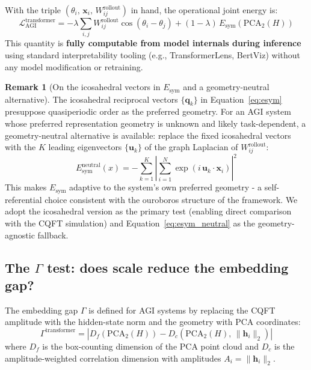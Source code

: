 \documentclass[12pt,a4paper]{article}
\theoremstyle{plain}
\theoremstyle{definition}
\newtheorem{remark}[theorem]{Remark}
\begin{document}
With the triple $(\theta_i,\, \mathbf{x}_i,\, W_{ij}^{\text{rollout}})$
in hand, the operational joint energy is:
\begin{equation}
\label{eq:lagrangian_transformer}
\mathcal{L}_{\text{AGI}}^{\text{transformer}}
  = -\lambda \sum_{i,j} W_{ij}^{\text{rollout}}
    \cos\!\left(\theta_i - \theta_j\right)
  + (1-\lambda)\, E_{\text{sym}}\!\left(\text{PCA}_2(H)\right)
\end{equation}
This quantity is \textbf{fully computable from model internals during
inference} using standard interpretability tooling (e.g.,
TransformerLens, BertViz) without any model modification or retraining.

\begin{remark}[On the icosahedral vectors in $E_{\text{sym}}$ and a
               geometry-neutral alternative]
\label{rem:esym_neutral}
The icosahedral reciprocal vectors $\{\mathbf{q}_k\}$ in
Equation~\eqref{eq:esym} presuppose quasiperiodic order as the preferred
geometry. For an AGI system whose preferred representation geometry is
unknown and likely task-dependent, a geometry-neutral alternative is
available: replace the fixed icosahedral vectors with the $K$ leading
eigenvectors $\{\mathbf{u}_k\}$ of the graph Laplacian of
$W_{ij}^{\text{rollout}}$:
\begin{equation}
\label{eq:esym_neutral}
E_{\text{sym}}^{\text{neutral}}(x)
  = -\sum_{k=1}^{K}\left|
      \sum_{i=1}^{N} \exp\!\left(i\,\mathbf{u}_k \cdot \mathbf{x}_i\right)
    \right|^2
\end{equation}
This makes $E_{\text{sym}}$ adaptive to the system's own preferred
geometry - a self-referential choice consistent with the ouroboros
structure of the framework. We adopt the icosahedral version as the
primary test (enabling direct comparison with the CQFT simulation) and
Equation~\eqref{eq:esym_neutral} as the geometry-agnostic fallback.
\end{remark}

\subsection{The $\Gamma$ test: does scale reduce the embedding gap?}
\label{subsec:gamma_agi}

The embedding gap $\Gamma$ is defined for AGI systems by replacing the
CQFT amplitude with the hidden-state norm and the geometry with PCA
coordinates:
\begin{equation}
\label{eq:gamma_agi}
\Gamma^{\text{transformer}} = \left|
  D_f\!\left(\text{PCA}_2(H)\right)
  - D_c\!\left(\text{PCA}_2(H),\, \|\mathbf{h}_i\|_2\right)
\right|
\end{equation}
where $D_f$ is the box-counting dimension of the PCA point cloud and
$D_c$ is the amplitude-weighted correlation dimension with amplitudes
$A_i = \|\mathbf{h}_i\|_2$.
\end{document}
